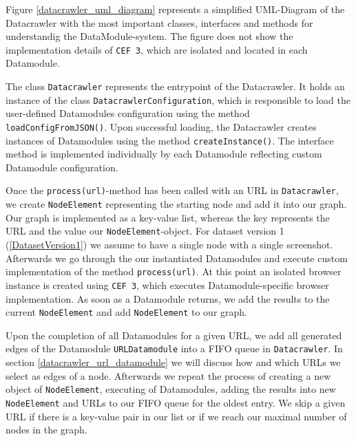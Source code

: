 Figure \ref{datacrawler_uml_diagram} represents a simplified UML-Diagram of the Datacrawler with the most important classes, interfaces and methods for understandig the DataModule-system. The figure does not show the implementation details of \texttt{CEF 3}, which are isolated and located in each Datamodule.

The class \texttt{Datacrawler} represents the entrypoint of the Datacrawler. It holds an instance of the class \texttt{DatacrawlerConfiguration}, which is responsible to load the user-defined Datamodules configuration using the method \texttt{loadConfigFromJSON()}. Upon successful loading, the Datacrawler creates instances of Datamodules using the method \texttt{createInstance()}. The interface method is implemented individually by each Datamodule reflecting custom Datamodule configuration. 

Once the \texttt{process(url)}-method has been called with an URL in \texttt{Datacrawler}, we create \texttt{NodeElement} representing the starting node and add it into our graph. Our graph is implemented as a key-value list, whereas the key represents the URL and the value our \texttt{NodeElement}-object. For dataset version 1 (\ref{DatasetVersion1}) we assume to have a single node with a single screenshot. Afterwards we go through the our instantiated Datamodules and execute custom implementation of the method \texttt{process(url)}. At this point an isolated browser instance is created using \texttt{CEF 3}, which executes Datamodule-specific browser implementation. As soon as a Datamodule returns, we add the results to the current \texttt{NodeElement} and add \texttt{NodeElement} to our graph. 

Upon the completion of all Datamodules for a given URL, we add all generated edges of the Datamodule \texttt{URLDatamodule} into a FIFO queue in \texttt{Datacrawler}. In section \ref{datacrawler_url_datamodule} we will discuss how and which URLs we select as edges of a node. Afterwards we repeat the process of creating a new object of \texttt{NodeElement}, executing of Datamodules, adding the results into new \texttt{NodeElement} and URLs to our FIFO queue for the oldest entry. We skip a given URL if there is a key-value pair in our list or if we reach our maximal number of nodes in the graph.

